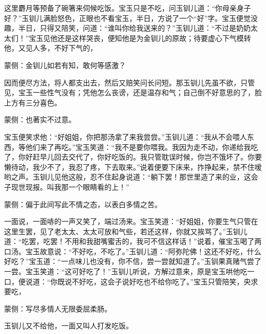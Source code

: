 \begin{parag}
    这里麝月等预备了碗箸来伺候吃饭。宝玉只是不吃，问玉钏儿道：“你母亲身子好？”玉钏儿满脸怒色，正眼也不看宝玉，半日，方说了一个“好”字。宝玉便觉没趣，半日，只得又陪笑，问道：“谁叫你给我送来的？”玉钏儿道：“不过是奶奶太太们！”宝玉见他还是这样哭丧，便知他是为金钏儿的原故；待要虚心下气模转他，又见人多，不好下气的，\begin{note}蒙侧：金钏儿如若有知，敢何等感激？\end{note}因而便尽方法，将人都支出去，然后又赔笑问长问短。那玉钏儿先虽不欲，只管见，宝玉一些性气没有；凭他怎么丧谤，还是温存和气；自己倒不好意思的了，脸上方有三分喜色。\begin{note}蒙侧：也著实不过意。\end{note}宝玉便笑求他：“好姐姐，你把那汤拿了来我尝尝。”玉钏儿道：“我从不会喂人东西，等他们来了再吃。”宝玉笑道：“我不是要你喂我。我因为走不动，你递给我吃了，你好赶早儿回去交代了，你好吃饭的。我只管耽误时候，你岂不饿坏了。你要懒待动，我少不了，我忍了疼，下去取来。”说着便要下床来，拃挣起来，禁不住嗳哟之声。玉钏儿见他这般，忍不住起身说道：“躺下罢！那世里造了来的业，这会子现世现报。叫我那一个眼睛看的上！”\begin{note}蒙侧：偏于此间写此不情之态，以表白多情之苦。\end{note}一面说，一面哧的一声又笑了，端过汤来。宝玉笑道：“好姐姐，你要生气只管在这里生罢，见了老太太、太太可放和气些，若还这样，你就又挨骂了。”玉钏儿道：“吃罢，吃罢！不用和我甜嘴蜜舌的，我可不信这样话！”说着，催宝玉喝了两口汤。宝玉故意说：“不好吃，不吃了。”玉钏儿道：“阿弥陀佛！这还不好吃，什么好吃？”宝玉道：“一点味儿也没有，你不信，尝一尝就知道了。”玉钏果真赌气尝了一尝。宝玉笑道：“这可好吃了！”玉钏儿听说，方解过意来，原是宝玉哄他吃一口，便说道：“你既说不好吃，这会子说好吃也不给你吃了。”宝玉只管陪笑，央求要吃，\begin{note}蒙侧：写尽多情人无限委屈柔肠。\end{note}玉钏儿又不给他，一面又叫人打发吃饭。
\end{parag}


